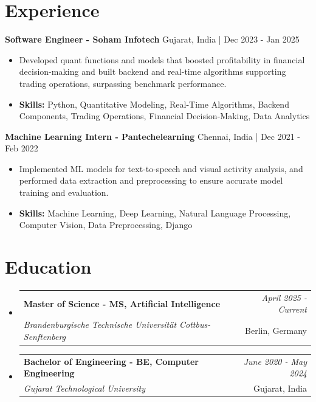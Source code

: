 \documentclass[a4paper,11pt]{article}
\makeatletter
\newcommand{\resumeSubheading}[4]{
\vspace{0.5mm}\item
    \begin{tabular*}{\linewidth}[t]{l@{\extracolsep{\fill}}r}
        \textbf{#1} & \textit{\footnotesize{#4}} \\
        \textit{\footnotesize{#3}} &  \footnotesize{#2}\\
    \end{tabular*}
    \vspace{-2.4mm}
}
\makeatother
\begin{document}
\section{\textbf{Experience}}


\vspace{1mm}
  \textbf{Software Engineer - Soham Infotech} \hfill Gujarat, India | Dec 2023 - Jan 2025
\vspace{-1.5mm} %
\begin{itemize}
  \item Developed quant functions and models that boosted profitability in financial decision-making and built backend and real-time algorithms supporting trading operations, surpassing benchmark performance.

\vspace{-2mm}
  \item \textbf{Skills:} Python, Quantitative Modeling, Real-Time Algorithms, Backend Components, Trading Operations, Financial Decision-Making, Data Analytics
\end{itemize}

\vspace{1mm}
  \textbf{Machine Learning Intern - Pantechelearning} \hfill Chennai, India | Dec 2021 - Feb 2022
\vspace{-1.5mm} %
\begin{itemize}
  \item Implemented ML models for text-to-speech and visual activity analysis, and performed data extraction and preprocessing to ensure accurate model training and evaluation.
\vspace{-2mm}
  \item \textbf{Skills:} Machine Learning, Deep Learning, Natural Language Processing, Computer Vision, Data Preprocessing, Django
\end{itemize}\section{\textbf{Education}}
\vspace{-0.4mm}

\begin{itemize}[leftmargin=0.15in, label={}]
\resumeSubheading
{Master of Science - MS, Artificial Intelligence }{Berlin, Germany}
{Brandenburgische Technische Universität Cottbus-Senftenberg  }{April 2025 - Current}

\vspace{1.0mm} %
\resumeSubheading
{Bachelor of Engineering - BE, Computer Engineering  }{Gujarat, India}
{Gujarat Technological University }{June 2020 - May 2024}

\end{itemize}
\end{document}
